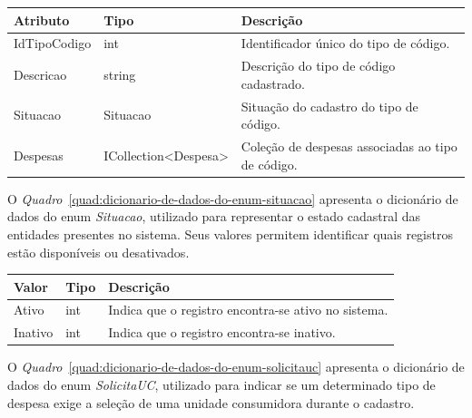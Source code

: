 \begin{quadro}[H]
\caption[Dicionário de dados da entidade TipoCodigo]{Dicionário de dados da entidade TipoCodigo}
\label{quad:dicionario-de-dados-da-entidade-tipocodigo}

\begin{tabular}{|p{}|p{}|p{}|}
\hline
\textbf{Atributo} & \textbf{Tipo} & \textbf{Descrição} \\ 
\hline
IdTipoCodigo & int & Identificador único do tipo de código. \\ 
\hline
Descricao & string & Descrição do tipo de código cadastrado. \\ 
\hline
Situacao & Situacao & Situação do cadastro do tipo de código. \\ 
\hline
Despesas & ICollection<Despesa> & Coleção de despesas associadas ao tipo de código. \\ 
\hline
\end{tabular}


\end{quadro}



O \textit{Quadro}~\ref{quad:dicionario-de-dados-do-enum-situacao} apresenta o dicionário de dados do enum \textit{Situacao}, utilizado para representar o estado cadastral das entidades presentes no sistema. Seus valores permitem identificar quais registros estão disponíveis ou desativados.

\begin{quadro}[H]
\caption[Dicionário de dados do enum Situacao]{Dicionário de dados do enum Situacao}
\label{quad:dicionario-de-dados-do-enum-situacao}

\begin{tabular}{|p{}|p{}|p{}|}
\hline
\textbf{Valor} & \textbf{Tipo} & \textbf{Descrição} \\ 
\hline
Ativo & int & Indica que o registro encontra-se ativo no sistema. \\ 
\hline
Inativo & int & Indica que o registro encontra-se inativo. \\ 
\hline
\end{tabular}


\end{quadro}



O \textit{Quadro}~\ref{quad:dicionario-de-dados-do-enum-solicitauc} apresenta o dicionário de dados do enum \textit{SolicitaUC}, utilizado para indicar se um determinado tipo de despesa exige a seleção de uma unidade consumidora durante o cadastro.

